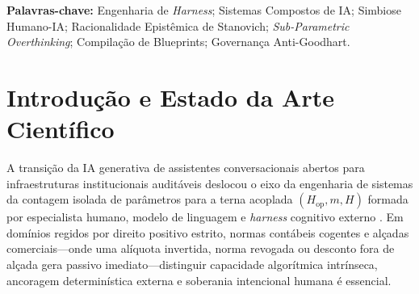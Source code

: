 \documentclass[10pt,twocolumn]{article}
\begin{document}
\begin{abstract}
ass\'incrono sob ordem parcial jur\'idica $\preceq_{\mathrm{jur}}$ (\texttt{M6}), naturalidade condicionada e voz \texttt{AST SSML} (\texttt{M7}), e simbiose Humano-IA com quatro checkpoints de revoga\c{c}\~ao em voo \texttt{CP-1..3}, filas erg\'odicas ($\varrho_q \le 0,80 < 1$), ACL f\'isica SQL sob \texttt{Two-Person Rule} e ciclo Anti-Goodhart verificado por DAG (\texttt{M8}), certificado em $13$ baterias E2E (\texttt{B1--B13}).
\end{abstract}

\noindent\textbf{Palavras-chave:} Engenharia de \emph{Harness}; Sistemas Compostos de IA; Simbiose Humano-IA; Racionalidade Epist\^emica de Stanovich; \emph{Sub-Parametric Overthinking}; Compila\c{c}\~ao de Blueprints; Governan\c{c}a Anti-Goodhart.

\section{Introdu\c{c}\~ao e Estado da Arte Cient\'ifico}

A transi\c{c}\~ao da IA generativa de assistentes conversacionais abertos para infraestruturas institucionais audit\'aveis deslocou o eixo da engenharia de sistemas da contagem isolada de par\^ametros para a terna acoplada $(H_{\mathrm{op}}, m, H)$ formada por especialista humano, modelo de linguagem e \emph{harness} cognitivo externo \cite{zaharia2024shift,khattab2024dspy,bansal2021does}. Em dom\'inios regidos por direito positivo estrito, normas cont\'abeis cogentes e al\c{c}adas comerciais---onde uma al\'iquota invertida, norma revogada ou desconto fora de al\c{c}ada gera passivo imediato---distinguir capacidade algor\'itmica intr\'inseca, ancoragem determin\'istica externa e soberania intencional humana \'e essencial.
\end{document}
